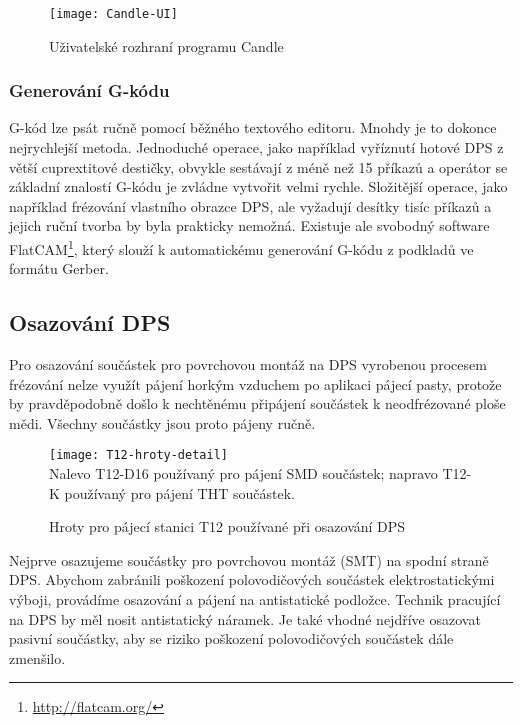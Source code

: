\begin{figure}[htbp]
    \centering
    \texttt{[image: Candle-UI]}
    \caption{Uživatelské rozhraní programu Candle}
    \label{fig:CNC Candle}
\end{figure}


\subsubsection{Generování G-kódu}
G-kód lze psát ručně pomocí běžného textového editoru. Mnohdy je to dokonce
nejrychlejší metoda. Jednoduché operace, jako například vyříznutí hotové DPS
z větší cuprextitové destičky, obvykle sestávají z méně než 15 příkazů
a operátor se základní znalostí G-kódu je zvládne vytvořit velmi rychle.
Složitější operace, jako například frézování vlastního obrazce DPS, ale
vyžadují desítky tisíc příkazů a jejich ruční tvorba by byla prakticky nemožná.
Existuje ale svobodný software FlatCAM\footnote{\url{http://flatcam.org/}},
který slouží k automatickému generování G-kódu z podkladů ve formátu Gerber.


\subsection{Osazování DPS}
Pro osazování součástek pro povrchovou montáž na DPS vyrobenou procesem
frézování nelze využít pájení horkým vzduchem po aplikaci pájecí pasty, protože
by pravděpodobně došlo k nechtěnému připájení součástek k neodfrézované ploše
mědi. Všechny součástky jsou proto pájeny ručně.

\begin{figure}[htb]
    \centering
    \texttt{[image: T12-hroty-detail]}
    \\
    {\footnotesize Nalevo T12-D16 používaný pro pájení SMD součástek;
    napravo T12-K používaný pro pájení THT součástek.}
    \caption{Hroty pro pájecí stanici T12 používané při osazování DPS}
    \label{fig:PCB pajecka hroty}
\end{figure}

Nejprve osazujeme součástky pro povrchovou montáž (SMT) na spodní straně DPS.
Abychom zabránili poškození polovodičových součástek elektrostatickými výboji,
provádíme osazování a pájení na antistatické podložce. Technik pracující na DPS
by měl nosit antistatický náramek. Je také vhodné nejdříve osazovat pasivní
součástky, aby se riziko poškození polovodičových součástek dále zmenšilo.

